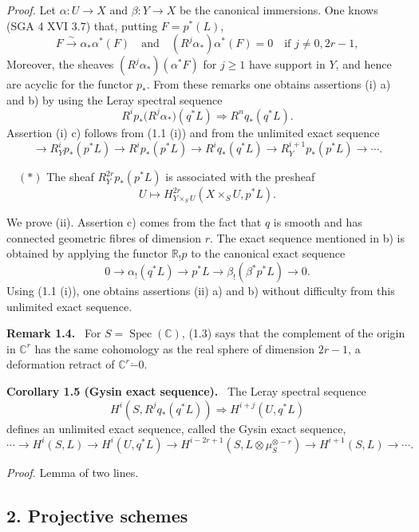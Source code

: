 \documentclass[11pt]{article}
\newenvironment{statement}[1]{\par\medskip\noindent\textbf{#1.}\ }{\par\medskip}
\begin{document}
\emph{Proof.} Let $\alpha:U\to X$ and $\beta:Y\to X$ be the canonical immersions. One knows (SGA 4 XVI 3.7) that, putting $F=p^*(L)$,
\[
F\xrightarrow{\sim}\alpha_*\alpha^*(F)
\quad\text{and}\quad
(R^j\alpha_*)\alpha^*(F)=0\quad\text{if }j\ne0,2r-1,
\]
Moreover, the sheaves $(R^j\alpha_*)(\alpha^*F)$ for $j\ge1$ have support in $Y$, and hence are acyclic for the functor $p_*$. From these remarks one obtains assertions (i) a) and b) by using the Leray spectral sequence
\[
R^i p_*\bigl(R^j\alpha_*\bigr)(q^*L)\Longrightarrow R^n q_*(q^*L).
\]
Assertion (i) c) follows from (1.1 (i)) and from the unlimited exact sequence
\[
\longrightarrow R_Y^i p_*(p^*L)\longrightarrow R^i p_*(p^*L)\longrightarrow R^i q_*(q^*L)
\longrightarrow R_Y^{i+1}p_*(p^*L)\longrightarrow\cdots.
\]

\(\quad (*)\) The sheaf $R_Y^{2r}p_*(p^*L)$ is associated with the presheaf
\[
U\longmapsto H^{2r}_{Y\times_S U}(X\times_S U,p^*L).
\]

We prove (ii). Assertion c) comes from the fact that $q$ is smooth and has connected geometric fibres of dimension $r$. The exact sequence mentioned in b) is obtained by applying the functor $\mathbb{R}_!p$ to the canonical exact sequence
\[
0\longrightarrow \alpha_!(q^*L)\longrightarrow p^*L\longrightarrow \beta_!(\beta^*p^*L)\longrightarrow 0.
\]
Using (1.1 (i)), one obtains assertions (ii) a) and b) without difficulty from this unlimited exact sequence.

\begin{statement}{Remark 1.4}
For $S=\operatorname{Spec}(\mathbb C)$, (1.3) says that the complement of the origin in $\mathbb C^r$ has the same cohomology as the real sphere of dimension $2r-1$, a deformation retract of $\mathbb C^r\mathbin{\dot{-}}0$.
\end{statement}

\begin{statement}{Corollary 1.5 (Gysin exact sequence)}
The Leray spectral sequence
\[
H^i(S,R^j q_*(q^*L))\Rightarrow H^{i+j}(U,q^*L)
\]
defines an unlimited exact sequence, called the Gysin exact sequence,
\[
\cdots\longrightarrow H^i(S,L)\longrightarrow H^i(U,q^*L)\longrightarrow
H^{i-2r+1}(S,L\otimes\mu_S^{\otimes -r})\longrightarrow H^{i+1}(S,L)\longrightarrow\cdots.
\]
\end{statement}

\emph{Proof.} Lemma of two lines.

\subsection*{2. Projective schemes}
\end{document}
